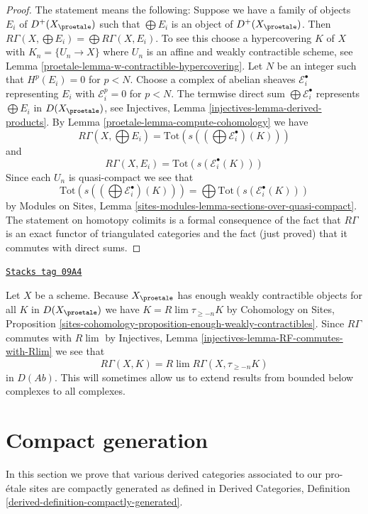 \begin{proof}

The statement means the following: Suppose we have a family of objects
$E_i$ of $D^+(X_\proetale)$ such that $\bigoplus E_i$ is an object
of $D^+(X_\proetale)$. Then
$R\Gamma(X, \bigoplus E_i) = \bigoplus R\Gamma(X, E_i)$.
To see this choose a hypercovering $K$ of $X$ with $K_n = \{U_n \to X\}$
where $U_n$ is an affine and weakly contractible scheme, see
Lemma \ref{proetale-lemma-w-contractible-hypercovering}.
Let $N$ be an integer such that $H^p(E_i) = 0$ for $p < N$.
Choose a complex of abelian sheaves $\mathcal{E}_i^\bullet$
representing $E_i$ with $\mathcal{E}_i^p = 0$ for $p < N$.
The termwise direct sum $\bigoplus \mathcal{E}_i^\bullet$ represents
$\bigoplus E_i$ in $D(X_\proetale)$, see
Injectives, Lemma \ref{injectives-lemma-derived-products}.
By Lemma \ref{proetale-lemma-compute-cohomology} we have
$$
R\Gamma(X, \bigoplus E_i) =
\text{Tot}(s((\bigoplus \mathcal{E}^\bullet_i)(K)))
$$
and
$$
R\Gamma(X, E_i) = \text{Tot}(s(\mathcal{E}^\bullet_i(K)))
$$
Since each $U_n$ is quasi-compact we see that
$$
\text{Tot}(s((\bigoplus \mathcal{E}^\bullet_i)(K))) =
\bigoplus \text{Tot}(s(\mathcal{E}^\bullet_i(K)))
$$
by Modules on Sites, Lemma
\ref{sites-modules-lemma-sections-over-quasi-compact}.
The statement on homotopy colimits is a formal consequence of the fact
that $R\Gamma$ is an exact functor of triangulated categories and the
fact (just proved) that it commutes with direct sums.
\end{proof}

\begin{remark}
\label{proetale-remark-extend-to-all}
\href{https://stacks.math.columbia.edu/tag/09A4}{\texttt{Stacks tag 09A4}}

Let $X$ be a scheme. Because $X_\proetale$ has enough weakly contractible
objects for all $K$ in $D(X_\proetale)$ we have $K = R\lim \tau_{\geq -n}K$
by
Cohomology on Sites, Proposition
\ref{sites-cohomology-proposition-enough-weakly-contractibles}.
Since $R\Gamma$ commutes with $R\lim$ by
Injectives, Lemma \ref{injectives-lemma-RF-commutes-with-Rlim}
we see that
$$
R\Gamma(X, K) = R\lim R\Gamma(X, \tau_{\geq -n}K)
$$
in $D(\textit{Ab})$. This will sometimes allow us to extend results from
bounded below complexes to all complexes.
\end{remark}

\section{Compact generation}
\label{proetale-section-compact-generation}
In this section we prove that various derived categories associated
to our pro-\'etale sites are compactly generated as defined in
Derived Categories, Definition \ref{derived-definition-compactly-generated}.

